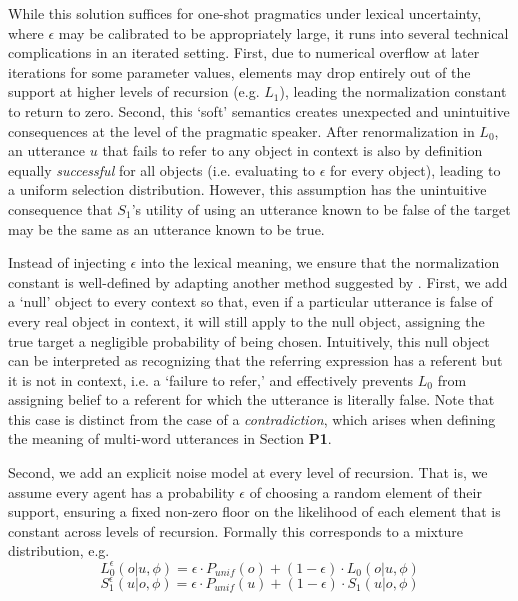 \documentclass[10pt, jou, floatsintext]{apa7}
\begin{document}
While this solution suffices for one-shot pragmatics under lexical uncertainty, where $\epsilon$ may be calibrated to be appropriately large, it runs into several technical complications in an iterated setting.
First, due to numerical overflow at later iterations for some parameter values, elements may drop entirely out of the support at higher levels of recursion (e.g. $L_1$), leading the normalization constant to return to zero. 
Second, this `soft' semantics creates unexpected and unintuitive consequences at the level of the pragmatic speaker. 
After renormalization in $L_0$, an utterance $u$ that fails to refer to any object in context is also by definition equally \emph{successful} for all objects (i.e. evaluating to $\epsilon$ for every object), leading to a uniform selection distribution.
However, this assumption has the unintuitive consequence that $S_1$'s utility of using an utterance known to be false of the target may be the same as an utterance known to be true.



Instead of injecting $\epsilon$ into the lexical meaning, we ensure that the normalization constant is well-defined by adapting another method suggested by .
First, we add a `null' object to every context so that, even if a particular utterance is false of every real object in context, it will still apply to the null object, assigning the true target a negligible probability of being chosen.
Intuitively, this null object can be interpreted as recognizing that the referring expression has a referent but it is not in context, i.e. a `failure to refer,' and effectively prevents $L_0$ from assigning belief to a referent for which the utterance is literally false.
Note that this case is distinct from the case of a \emph{contradiction}, which arises when defining the meaning of multi-word utterances in Section \textbf{P1}.

Second, we add an explicit noise model at every level of recursion.
That is, we assume every agent has a probability $\epsilon$ of choosing a random element of their support, ensuring a fixed non-zero floor on the likelihood of each element that is constant across levels of recursion.
Formally this corresponds to a mixture distribution, e.g. 
$$L_0^{\epsilon}(o|u,\phi) = \epsilon \cdot P_{unif}(o) + (1-\epsilon) \cdot L_0(o|u,\phi)$$
$$S_1^{\epsilon}(u|o,\phi) = \epsilon \cdot P_{unif}(u) + (1-\epsilon) \cdot S_1(u|o,\phi)$$
\end{document}
